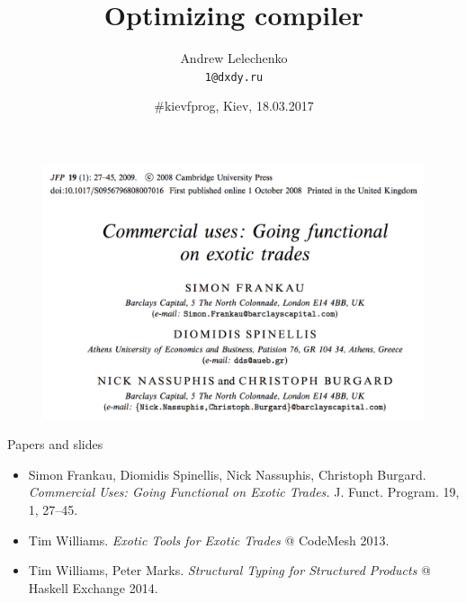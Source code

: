 \documentclass[handout]{beamer}
\title{Optimizing compiler}
\author[Andrew Lelechenko]{Andrew Lelechenko \\ \texttt{1@dxdy.ru}}
\date{\#kievfprog, Kiev, 18.03.2017}
\begin{document}
\begin{frame}
	\titlepage
\end{frame}

\begin{frame}

\begin{figure}[H]
\centering
\includegraphics[width=\textwidth]{paper.png}
\end{figure}
\end{frame}

\begin{frame}{Papers and slides}

\begin{itemize}
\item Simon Frankau, Diomidis Spinellis, Nick Nassuphis, Christoph Burgard.
      {\em Commercial Uses: Going Functional on Exotic Trades.}
      J. Funct. Program. 19, 1, 27--45.

\bigskip

\item Tim Williams. {\em Exotic Tools for Exotic Trades} @ CodeMesh 2013.

\item Tim Williams, Peter Marks. {\em Structural Typing for Structured Products}
      @ Haskell Exchange 2014.
\end{itemize}

\end{frame}
\end{document}
